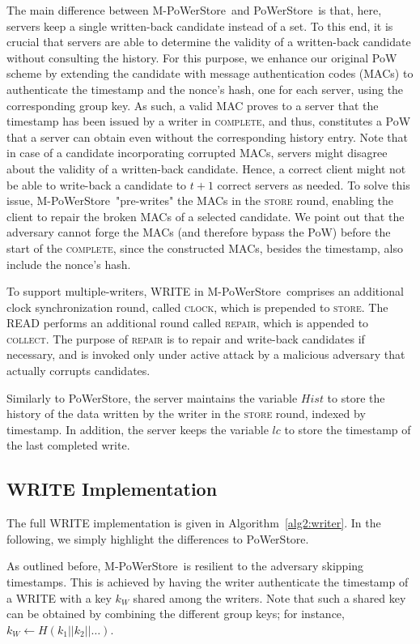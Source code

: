 \documentclass[10pt,conference,compsocconf]{IEEEtran}
\newcommand{\protocol}{PoWerStore}
\newcommand{\mprotocol}{M-PoWerStore}
\newcommand{\complete}{\textsc{complete}}
\begin{document}
The main difference between \mprotocol\ and \protocol\ is that, here, servers keep a single written-back candidate instead of a set. To this end, it is crucial that servers are able to determine the validity of a written-back candidate without consulting the history. For this purpose, we enhance our original PoW scheme by extending the candidate with message authentication codes (MACs) to authenticate the timestamp and the nonce's hash, one for each server, using the corresponding group key. As such, a valid MAC proves to a server that the timestamp has been issued by a writer in \complete, and thus, constitutes a PoW that a server can obtain even without the corresponding history entry. Note that in case of a candidate incorporating corrupted MACs, servers might disagree about the validity of a written-back candidate. Hence, a correct client might not be able to write-back a candidate to $t+1$ correct servers as needed. To solve this issue, \mprotocol\ "pre-writes" the MACs in the \textsc{store} round, enabling the client to repair the broken MACs of a selected candidate. We point out that the adversary cannot forge the MACs (and therefore bypass the PoW) before the start of the \complete, since the constructed MACs, besides the timestamp, also include the nonce's hash.

To support multiple-writers, \textsc{WRITE} in \mprotocol\ comprises an additional clock synchronization round, called \textsc{clock}, which is prepended to \textsc{store}. The \textsc{READ} performs an additional round called \textsc{repair}, which is appended to \textsc{collect}. The purpose of \textsc{repair} is to repair and write-back candidates if necessary, and is invoked only under active attack by a malicious adversary that actually corrupts candidates.

Similarly to \protocol, the server maintains the variable $Hist$ to store the history of the data written by the writer in the \textsc{store} round, indexed by timestamp. In addition, the server keeps the variable $lc$ to store the timestamp of the last completed write.

\subsection{\textsc{WRITE} Implementation}
The full \textsc{WRITE} implementation is given in Algorithm~\ref{alg2:writer}. In the following, we simply highlight the differences to \protocol.

As outlined before, \mprotocol\ is resilient to the adversary skipping timestamps. This is achieved by having the writer authenticate the timestamp of a \textsc{WRITE} with a key $k_W$ shared among the writers. Note that such a shared key can be obtained by combining the different group keys; for instance, $k_W \leftarrow H(k_1 || k_2 || \dots)$.
\end{document}
